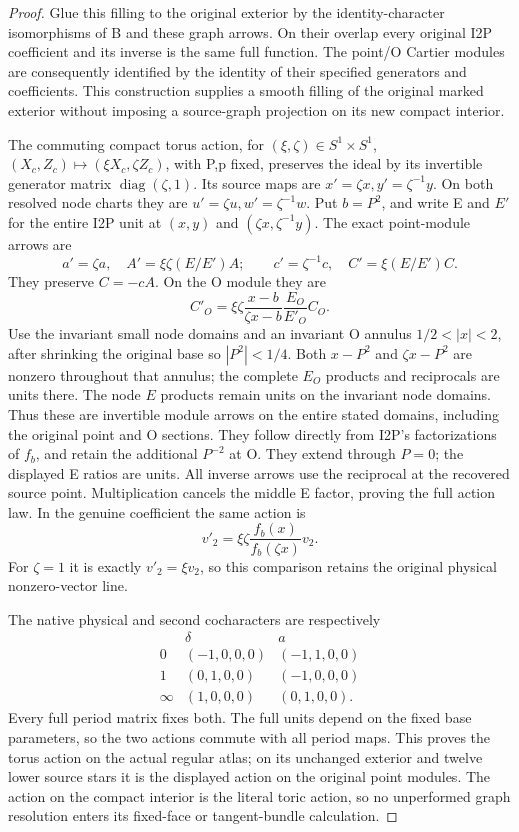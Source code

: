 \begin{proof}
Glue this filling to the original exterior by the identity-character
isomorphisms of B and these graph arrows.  On their overlap every original
I2P coefficient and its inverse is the same full function.  The point/O
Cartier modules are consequently identified by the identity of their
specified generators and coefficients.  This construction supplies a
smooth filling of the original marked exterior without imposing a
source-graph projection on its new compact interior.

The commuting compact torus action, for \((\xi,\zeta)\in S^1\times S^1\),
\((X_c,Z_c)\mapsto(\xi X_c,\zeta Z_c)\), with P,p fixed, preserves the
ideal by its invertible generator matrix \(\operatorname{diag}(\zeta,1)\).
Its source maps are \(x'=\zeta x,y'=\zeta^{-1}y\).  On both resolved
node charts they are \(u'=\zeta u,w'=\zeta^{-1}w\).
Put \(b=P^2\), and write E and \(E'\) for the entire I2P unit at
\((x,y)\) and \((\zeta x,\zeta^{-1}y)\).  The exact point-module arrows are
\[
a'=\zeta a,\quad A'=\xi\zeta(E/E')A;\qquad
c'=\zeta^{-1}c,\quad C'=\xi(E/E')C.
\]
They preserve \(C=-cA\).  On the O module they are
\[
C'_O=\xi\zeta\frac{x-b}{\zeta x-b}\frac{E_O}{E'_O}C_O.
\]
Use the invariant small node domains and an invariant O annulus
\(1/2<|x|<2\), after shrinking the original base so \(|P^2|<1/4\).
Both \(x-P^2\) and \(\zeta x-P^2\) are nonzero throughout that annulus;
the complete \(E_O\) products and reciprocals are units there.  The
node \(E\) products remain units on the invariant node domains.
Thus these are invertible module arrows on the entire stated domains,
including the original point and O sections.  They follow directly from
I2P's factorizations of \(f_b\), and retain the additional \(P^{-2}\)
at O.  They extend through \(P=0\); the displayed E ratios are units.
All inverse arrows use the reciprocal at the recovered source point.
Multiplication cancels the middle E factor, proving the full action law.
In the genuine coefficient the same action is
\[
v'_2=\xi\zeta\frac{f_b(x)}{f_b(\zeta x)}v_2.
\]
For \(\zeta=1\) it is exactly \(v'_2=\xi v_2\), so this comparison
retains the original physical nonzero-vector line.

The native physical and second cocharacters are respectively
\[
\begin{array}{c|cc}
&\delta&a\\\hline
0&(-1,0,0,0)&(-1,1,0,0)\\
1&(0,1,0,0)&(-1,0,0,0)\\
\infty&(1,0,0,0)&(0,1,0,0).
\end{array}
\]
Every full period matrix fixes both.  The full units depend on the fixed
base parameters, so the two actions commute with all period maps.  This
proves the torus action on the actual regular atlas; on its unchanged
exterior and twelve lower source stars it is the displayed action on the
original point modules.  The action on the compact interior is the
literal toric action, so no unperformed graph resolution enters its
fixed-face or tangent-bundle calculation.


\end{proof}
